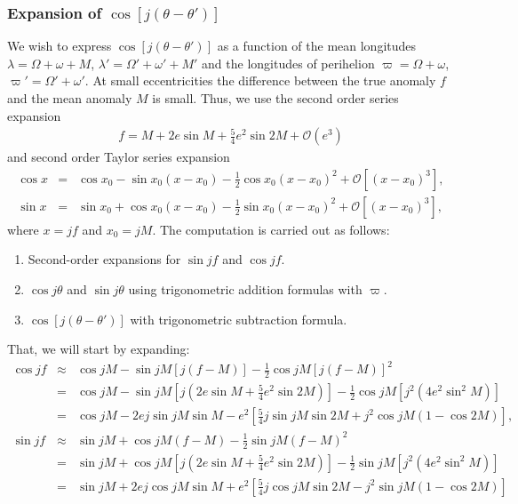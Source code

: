 \documentclass [12pt, a4paper] {article}
\begin{document}
\subsubsection{Expansion of $\cos[j(\theta - \theta')]$}
We wish to express $\cos[j(\theta - \theta')]$ as a function of the mean longitudes
$\lambda = \Omega + \omega + M$, $\lambda' = \Omega' + \omega' + M'$ and
the longitudes of perihelion $\varpi = \Omega + \omega$, $\varpi' = \Omega' + \omega'$.
At small eccentricities the difference between the true anomaly $f$ and the mean anomaly $M$ 
is small. Thus, we use the second order series expansion 
\begin {eqnarray}
    f = M + 2e\sin M + \frac{5}{4}e^2\sin 2M + \mathcal{O}(e^3)
\end {eqnarray}
and second order Taylor series expansion
\begin {eqnarray}
    \cos x &=& \cos x_0 - \sin x_0 (x - x_0) - \frac{1}{2}\cos x_0(x - x_0)^2 + \mathcal{O}[(x - x_0)^3],
    \\
    \sin x &=& \sin x_0 + \cos x_0 (x - x_0) - \frac{1}{2}\sin x_0(x - x_0)^2 + \mathcal{O}[(x - x_0)^3],
\end {eqnarray}
where $x=jf$ and $x_0 = jM$. The computation is carried out as follows: 
\begin {enumerate}
    \item Second-order expansions for $\sin jf$ and $\cos jf$.
    \item $\cos j\theta$ and $\sin j\theta$ using trigonometric addition formulas
          with $\varpi$.
    \item $\cos [j(\theta - \theta')]$ with trigonometric subtraction formula.
\end {enumerate}
That, we will start by expanding:
\begin {eqnarray}
    \cos jf 
    &\approx&
    \cos jM - \sin jM [j(f-M)] -\frac{1}{2}\cos jM [j(f-M)]^2
    \\
    &=& 
    \cos jM 
    - 
    \sin jM \left[j\left(2e\sin M + \frac{5}{4}e^2\sin 2M\right)\right]
    - 
    \frac{1}{2}\cos jM \left[j^2(4e^2\sin^2 M)\right]
    \\
    &=&
    \cos jM 
    - 
    2ej\sin jM\sin M
    -
    e^2
    \left[
        \frac{5}{4}j\sin jM\sin 2M + j^2\cos jM(1 - \cos 2M)
    \right],
    \\
    \sin jf 
    &\approx&
    \sin jM + \cos jM (f-M) -\frac{1}{2}\sin jM (f-M)^2
    \\
    &=&
    \sin jM 
    + 
    \cos jM
    \left[
        j\left(2e\sin M + \frac{5}{4}e^2\sin 2M\right)
    \right]
    - \frac{1}{2}\sin jM 
    \left[
        j^2
        \left(
            4e^2\sin^2 M
        \right)
    \right]
    \\
    &=& 
    \sin jM 
    +
    2ej\cos jM\sin M 
    + 
    e^2
    \left[
        \frac{5}{4}j\cos jM\sin 2M 
        -
        j^2\sin jM 
        \left(
            1 - \cos 2M
        \right)
    \right]
\end {eqnarray}
\end{document}
